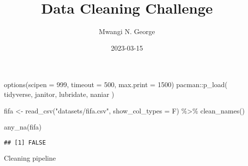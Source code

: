 \documentclass[
]{article}
\title{Data Cleaning Challenge}
\author{Mwangi N. George}
\date{2023-03-15}
\newenvironment{Shaded}{\begin{snugshade}}{\end{snugshade}}
\newcommand{\AttributeTok}[1]{\textcolor[rgb]{0.77,0.63,0.00}{#1}}
\newcommand{\DecValTok}[1]{\textcolor[rgb]{0.00,0.00,0.81}{#1}}
\newcommand{\FunctionTok}[1]{\textcolor[rgb]{0.00,0.00,0.00}{#1}}
\newcommand{\NormalTok}[1]{#1}
\newcommand{\OtherTok}[1]{\textcolor[rgb]{0.56,0.35,0.01}{#1}}
\newcommand{\SpecialCharTok}[1]{\textcolor[rgb]{0.00,0.00,0.00}{#1}}
\newcommand{\StringTok}[1]{\textcolor[rgb]{0.31,0.60,0.02}{#1}}
\begin{document}
\maketitle

\begin{Shaded}
\begin{Highlighting}[]
\FunctionTok{options}\NormalTok{(}\AttributeTok{scipen =} \DecValTok{999}\NormalTok{, }\AttributeTok{timeout =} \DecValTok{500}\NormalTok{, }\AttributeTok{max.print =} \DecValTok{1500}\NormalTok{)}
\NormalTok{pacman}\SpecialCharTok{::}\FunctionTok{p\_load}\NormalTok{(}
\NormalTok{  tidyverse, janitor, lubridate, naniar}
\NormalTok{)}
\end{Highlighting}
\end{Shaded}

\begin{Shaded}
\begin{Highlighting}[]
\NormalTok{fifa }\OtherTok{\textless{}{-}} \FunctionTok{read\_csv}\NormalTok{(}\StringTok{"datasets/fifa.csv"}\NormalTok{, }\AttributeTok{show\_col\_types =}\NormalTok{ F) }\SpecialCharTok{\%\textgreater{}\%} 
  \FunctionTok{clean\_names}\NormalTok{() }

\FunctionTok{any\_na}\NormalTok{(fifa)}
\end{Highlighting}
\end{Shaded}

\begin{verbatim}
## [1] FALSE
\end{verbatim}

Cleaning pipeline
\end{document}
